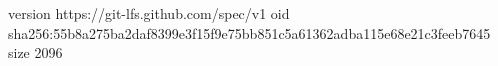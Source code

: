 version https://git-lfs.github.com/spec/v1
oid sha256:55b8a275ba2daf8399e3f15f9e75bb851c5a61362adba115e68e21c3feeb7645
size 2096
